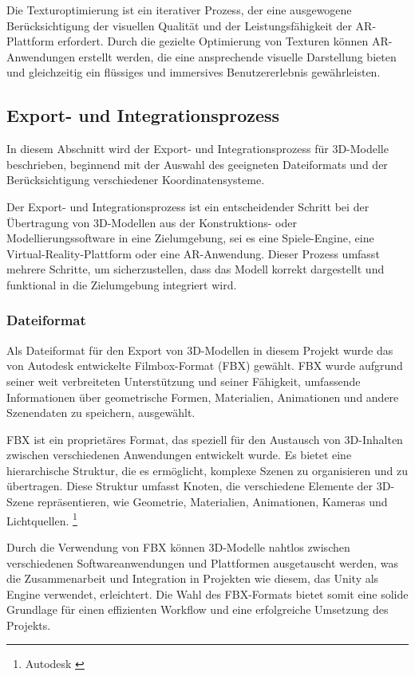 Die Texturoptimierung ist ein iterativer Prozess, der eine ausgewogene Berücksichtigung der visuellen Qualität und der
Leistungsfähigkeit der AR-Plattform erfordert. Durch die gezielte Optimierung von Texturen können AR-Anwendungen erstellt
werden, die eine ansprechende visuelle Darstellung bieten und gleichzeitig ein flüssiges und immersives Benutzererlebnis
gewährleisten.

\subsection{Export- und Integrationsprozess}
In diesem Abschnitt wird der Export- und Integrationsprozess für 3D-Modelle beschrieben, beginnend mit der Auswahl des
geeigneten Dateiformats und der Berücksichtigung verschiedener Koordinatensysteme.

Der Export- und Integrationsprozess ist ein entscheidender Schritt bei der Übertragung von 3D-Modellen aus der Konstruktions-
oder Modellierungssoftware in eine Zielumgebung, sei es eine Spiele-Engine, eine Virtual-Reality-Plattform oder eine AR-Anwendung.
Dieser Prozess umfasst mehrere Schritte, um sicherzustellen, dass das Modell korrekt dargestellt und funktional in die
Zielumgebung integriert wird.

\subsubsection{Dateiformat}
Als Dateiformat für den Export von 3D-Modellen in diesem Projekt wurde das von Autodesk entwickelte Filmbox-Format (FBX)
gewählt. FBX wurde aufgrund seiner weit verbreiteten Unterstützung und seiner Fähigkeit, umfassende Informationen über
geometrische Formen, Materialien, Animationen und andere Szenendaten zu speichern, ausgewählt.

FBX ist ein proprietäres Format, das speziell für den Austausch von 3D-Inhalten zwischen verschiedenen Anwendungen
entwickelt wurde. Es bietet eine hierarchische Struktur, die es ermöglicht, komplexe Szenen zu organisieren und zu
übertragen. Diese Struktur umfasst Knoten, die verschiedene Elemente der 3D-Szene repräsentieren, wie Geometrie,
Materialien, Animationen, Kameras und Lichtquellen. \footnote{Autodesk \cite{FBX. Getting started}}

Durch die Verwendung von FBX können 3D-Modelle nahtlos zwischen verschiedenen Softwareanwendungen und Plattformen
ausgetauscht werden, was die Zusammenarbeit und Integration in Projekten wie diesem, das Unity als Engine verwendet,
erleichtert. Die Wahl des FBX-Formats bietet somit eine solide Grundlage für einen effizienten Workflow und eine
erfolgreiche Umsetzung des Projekts.

